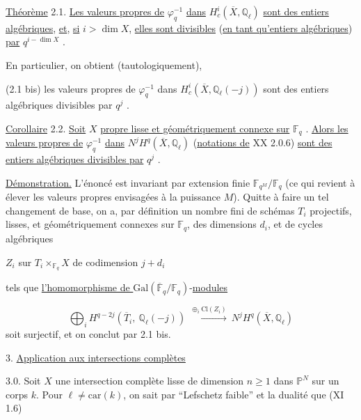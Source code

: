 \underline{Théorème} 2.1. \underline{Les valeurs propres de} $\varphi_q^{-1}$ \underline{dans} $H^i_c(\overline{X},\mathbb{Q}_\ell)$ \underline{sont des entiers algébriques}, \underline{et}, \underline{si} $i > \dim X$, \underline{elles sont divisibles} (\underline{en tant qu'entiers algébriques}) \underline{par} $q^{i-\dim X}$ .



En particulier, on obtient (tautologiquement),

(2.1 bis) \quad les valeurs propres de $\varphi_q^{-1}$ dans $H^i_c(\overline{X},\mathbb{Q}_\ell(-j))$ sont des entiers algébriques divisibles par $q^j$ .

\underline{Corollaire} 2.2. \underline{Soit} $X$ \underline{propre lisse et géométriquement connexe sur} $\mathbb{F}_q$ . \underline{Alors les valeurs propres de} $\varphi_q^{-1}$ \underline{dans} $N^jH^q(\overline{X},\mathbb{Q}_\ell)$ (\underline{notations de} XX 2.0.6) \underline{sont des entiers algébriques divisibles par} $q^j$ .

\underline{Démonstration.} L'énoncé est invariant par extension finie $\mathbb{F}_{q^M}/\mathbb{F}_q$ (ce qui revient à élever les valeurs propres envisagées à la puissance $M$). Quitte à faire un tel changement de base, on a, par définition un nombre fini de schémas $T_i$ projectifs, lisses, et géométriquement connexes sur $\mathbb{F}_q$, des dimensions $d_i$, et de cycles algébriques

$Z_i$ sur $T_i \times_{\mathbb{F}_q} X$ de codimension $j + d_i$

tels que \underline{l'homomorphisme de }$\mathrm{Gal}(\overline{\mathbb{F}}_q/\mathbb{F}_q)$-\underline{modules}

\begin{equation*}
\bigoplus_i H^{q-2j}(\overline{T}_i,\ \mathbb{Q}_\ell(-j)) \ \stackrel{\oplus_i \mathrm{Cl}(Z_i)}{\longrightarrow} \ N^jH^q(\overline{X},\mathbb{Q}_\ell)
\end{equation*}
soit surjectif, et on conclut par 2.1 bis.




3. \underline{Application aux intersections complètes}

3.0. Soit $X$ une intersection complète lisse de dimension $n \geq 1$ dans $\mathbb{P}^N$ sur un corps $k$. Pour $\ell \neq \mathrm{car}(k)$, on sait par ``Lefschetz faible'' et la dualité que (XI 1.6)

